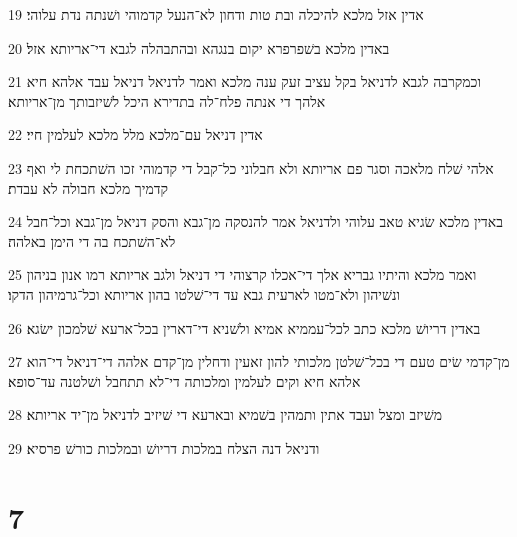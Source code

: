 \par 19 אדין אזל מלכא להיכלה ובת טות ודחון לא־הנעל קדמוהי ושׁנתה נדת עלוהי׃
\par 20 באדין מלכא בשׁפרפרא יקום בנגהא ובהתבהלה לגבא די־אריותא אזל׃
\par 21 וכמקרבה לגבא לדניאל בקל עציב זעק ענה מלכא ואמר לדניאל דניאל עבד אלהא חיא אלהך די אנתה פלח־לה בתדירא היכל לשׁיזבותך מן־אריותא׃
\par 22 אדין דניאל עם־מלכא מלל מלכא לעלמין חיי׃
\par 23 אלהי שׁלח מלאכה וסגר פם אריותא ולא חבלוני כל־קבל די קדמוהי זכו השׁתכחת לי ואף קדמיך מלכא חבולה לא עבדת׃
\par 24 באדין מלכא שׂגיא טאב עלוהי ולדניאל אמר להנסקה מן־גבא והסק דניאל מן־גבא וכל־חבל לא־השׁתכח בה די הימן באלהה׃
\par 25 ואמר מלכא והיתיו גבריא אלך די־אכלו קרצוהי די דניאל ולגב אריותא רמו אנון בניהון ונשׁיהון ולא־מטו לארעית גבא עד די־שׁלטו בהון אריותא וכל־גרמיהון הדקו׃
\par 26 באדין דריושׁ מלכא כתב לכל־עממיא אמיא ולשׁניא די־דארין בכל־ארעא שׁלמכון ישׂגא׃
\par 27 מן־קדמי שׂים טעם די בכל־שׁלטן מלכותי להון זאעין ודחלין מן־קדם אלהה די־דניאל די־הוא אלהא חיא וקים לעלמין ומלכותה די־לא תתחבל ושׁלטנה עד־סופא׃
\par 28 משׁיזב ומצל ועבד אתין ותמהין בשׁמיא ובארעא די שׁיזיב לדניאל מן־יד אריותא׃
\par 29 ודניאל דנה הצלח במלכות דריושׁ ובמלכות כורשׁ פרסיא׃

\chapter{7}

